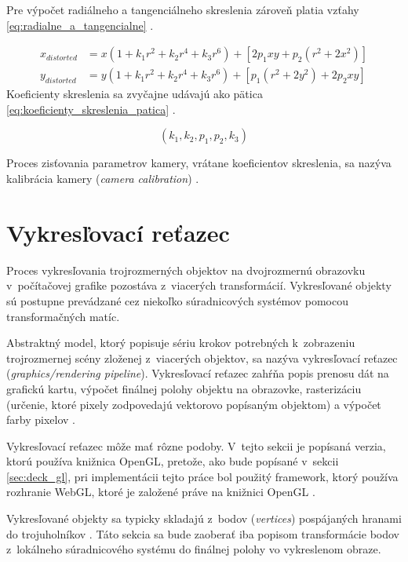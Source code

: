 Pre výpočet radiálneho a tangenciálneho skreslenia zároveň platia vzťahy \ref{eq:radialne_a_tangencialne} \cite{sun_cooperstock_camera_calibration}.

\begin{equation}
\begin{aligned}
x_{distorted} &= x(1 + k_1 r^2 + k_2 r^4 + k_3 r^6) + [2 p_1 x y + p_2(r^2 + 2 x^2)] \\
y_{distorted} &= y(1 + k_1 r^2 + k_2 r^4 + k_3 r^6) + [ p_1(r^2 + 2 y^2) + 2 p_2 x y]
\label{eq:radialne_a_tangencialne}
\end{aligned}
\end{equation}
Koeficienty skreslenia sa zvyčajne udávajú ako pätica \ref{eq:koeficienty_skreslenia_patica} \cite{opencv_camera_calibration}.

\begin{equation}
(k_1, k_2, p_1, p_2, k_3)
\label{eq:koeficienty_skreslenia_patica}
\end{equation}

Proces zisťovania parametrov kamery, vrátane koeficientov skreslenia, sa nazýva kalibrácia kamery (\emph{camera calibration}) \cite{matlab_camera_calibration}.

\section{Vykresľovací reťazec}

Proces vykresľovania trojrozmerných objektov na dvojrozmernú obrazovku v~počítačovej grafike pozostáva z~viacerých transformácií. Vykresľované objekty sú postupne prevádzané cez niekoľko súradnicových systémov pomocou transformačných matíc.

Abstraktný model, ktorý popisuje sériu krokov potrebných k~zobrazeniu trojrozmernej scény zloženej z~viacerých objektov, sa nazýva vykresľovací reťazec (\emph{graphics/rendering pipeline}). Vykresľovací reťazec zahŕňa popis prenosu dát na grafickú kartu, výpočet finálnej polohy objektu na obrazovke, rasterizáciu (určenie, ktoré pixely zodpovedajú vektorovo popísaným objektom) a výpočet farby pixelov \cite{stemkoski_graphics}.

Vykresľovací reťazec môže mať rôzne podoby. V~tejto sekcii je popísaná verzia, ktorú používa knižnica OpenGL, pretože, ako bude popísané v~sekcii \ref{sec:deck_gl}, pri implementácii tejto práce bol použitý framework, ktorý používa rozhranie WebGL, ktoré je založené práve na knižnici OpenGL \cite{webgl_overview}.

Vykresľované objekty sa typicky skladajú z~bodov (\emph{vertices}) pospájaných hranami do trojuholníkov \cite{stemkoski_graphics}. Táto sekcia sa bude zaoberať iba popisom transformácie bodov z~lokálneho súradnicového systému do finálnej polohy vo vykreslenom obraze.

